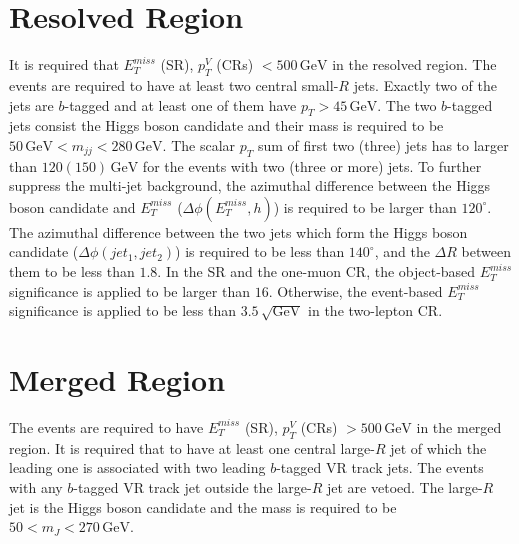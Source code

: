 \documentclass[class=NTHU_thesis, crop=false]{standalone}
\begin{document}
\section{Resolved Region}
It is required that $E^{miss}_T$ (SR), $p^V_T$ (CRs) $ < 500\, \mathrm{GeV}$ in the resolved region. The events are required to have at least two central small-$R$ jets. Exactly two of the jets are $b$-tagged and at least one of them have $p_T > 45\, \mathrm{GeV}$. The two $b$-tagged jets consist the Higgs boson candidate and their mass is required to be $50\, \mathrm{GeV} < m_{jj} < 280\, \mathrm{GeV}$. The scalar $p_T$ sum of first two (three) jets has to larger than $120 (150)\, \mathrm{GeV}$ for the events with two (three or more) jets. To further suppress the multi-jet background, the azimuthal difference between the Higgs boson candidate and $E^{miss}_T$ ($\Delta\phi(E^{miss}_T, h)$) is required to be larger than $120^\circ$. The azimuthal difference between the two jets which form the Higgs boson candidate ($\Delta\phi(jet_1, jet_2)$) is required to be less than $140^\circ$, and the ${\Delta}R$ between them to be less than $1.8$. In the SR and the one-muon CR, the object-based $E^{miss}_T$ significance is applied to be larger than $16$. Otherwise, the event-based $E^{miss}_T$ significance is applied to be less than $3.5\, \sqrt{\mathrm{GeV}}$ in the two-lepton CR.

\section{Merged Region}
The events are required to have $E^{miss}_T$ (SR), $p^V_T$ (CRs) $ > 500\, \mathrm{GeV}$ in the merged region. It is required that to have at least one central large-$R$ jet of which the leading one is associated with two leading $b$-tagged VR track jets. The events with any $b$-tagged VR track jet outside the large-$R$ jet are vetoed. The large-$R$ jet is the Higgs boson candidate and the mass is required to be $50 < m_{J} < 270\, \mathrm{GeV}$.
\end{document}
